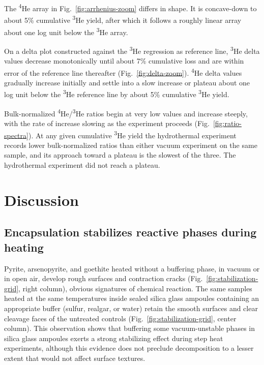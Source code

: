 The \textsuperscript{4}He array in Fig.~\ref{fig:arrhenius-zoom} differs in shape. It is concave-down to about 5\% cumulative \textsuperscript{3}He yield, after which it follows a roughly linear array about one log unit below the \textsuperscript{3}He array.

On a delta plot constructed against the \textsuperscript{3}He regression as reference line, \textsuperscript{3}He delta values decrease monotonically until about 7\% cumulative loss and are within error of the reference line thereafter (Fig.~\ref{fig:delta-zoom}). \textsuperscript{4}He delta values gradually increase initially and settle into a slow increase or plateau about one log unit below the \textsuperscript{3}He reference line by about 5\% cumulative \textsuperscript{3}He yield. 

Bulk-normalized \textsuperscript{4}He/\textsuperscript{3}He ratios begin at very low values and increase steeply, with the rate of increase slowing as the experiment proceeds (Fig.~\ref{fig:ratio-spectra}). At any given cumulative \textsuperscript{3}He yield the hydrothermal experiment records lower bulk-normalized ratios than either vacuum experiment on the same sample, and its approach toward a plateau is the slowest of the three. The hydrothermal experiment did not reach a plateau. 

\section{Discussion}\label{sec:discussion}

\subsection{Encapsulation stabilizes reactive phases during heating}\label{sec:results-stabilization}

Pyrite, arsenopyrite, and goethite heated without a buffering phase, in vacuum or in open air, develop rough surfaces and contraction cracks (Fig.~\ref{fig:stabilization-grid}, right column), obvious signatures of chemical reaction. The same samples heated at the same temperatures inside sealed silica glass ampoules containing an appropriate buffer (sulfur, realgar, or water) retain the smooth surfaces and clear cleavage faces of the untreated controls (Fig.~\ref{fig:stabilization-grid}, center column). This observation shows that buffering some vacuum-unstable phases in silica glass ampoules exerts a strong stabilizing effect during step heat experiments, although this evidence does not preclude decomposition to a lesser extent that would not affect surface textures. 

